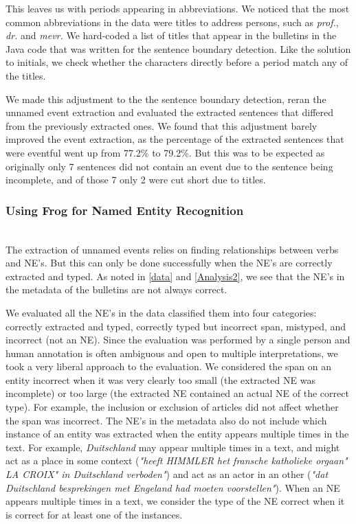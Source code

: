 \documentclass[a4paper, 10pt, conference]{ieeeconf}      %
\begin{document}
This leaves us with periods appearing in abbreviations. We noticed that the most common abbreviations in the data were titles to address persons, such as \textit{prof.}, \textit{dr.} and \textit{mevr.} We hard-coded a list of titles that appear in the bulletins in the Java code that was written for the sentence boundary detection. Like the solution to initials, we check whether the characters directly before a period match any of the titles. 

We made this adjustment to the the sentence boundary detection, reran the unnamed event extraction and evaluated the extracted sentences that differed from the previously extracted ones. We found that this adjustment barely improved the event extraction, as the percentage of the extracted sentences that were eventful went up from 77.2\% to 79.2\%. But this was to be expected as originally only 7 sentences did not contain an event due to the sentence being incomplete, and of those 7 only 2 were cut short due to titles. 

\subsubsection{Using Frog for Named Entity Recognition}\label{impr NE}~\\
The extraction of unnamed events relies on finding relationships between verbs and NE's. But this can only be done successfully when the NE's are correctly extracted and typed. As noted in \ref{data} and \ref{Analysis2}, we see that the NE's in the metadata of the bulletins are not always correct.

We evaluated all the NE's in the data classified them into four categories: correctly extracted and typed, correctly typed but incorrect span, mistyped, and incorrect (not an NE). Since the evaluation was performed by a single person and human annotation is often ambiguous and open to multiple interpretations\cite{inel2017harnessing}\cite{aroyo2015truth}, we took a very liberal approach to the evaluation. We considered the span on an entity incorrect when it was very clearly too small (the extracted NE was incomplete) or too large (the extracted NE contained an actual NE of the correct type). For example, the inclusion or exclusion of articles did not affect whether the span was incorrect. The NE's in the metadata also do not include which instance of an entity was extracted when the entity appears multiple times in the text. For example, \textit{Duitschland} may appear multiple times in a text, and might act as a place in some context (\textit{"heeft HIMMLER het fransche katholieke orgaan" LA CROIX" in Duitschland verboden"}) and act as an actor in an other (\textit{"dat Duitschland besprekingen met Engeland had moeten voorstellen"}). When an NE appears multiple times in a text, we consider the type of the NE correct when it is correct for at least one of the instances.
\end{document}
